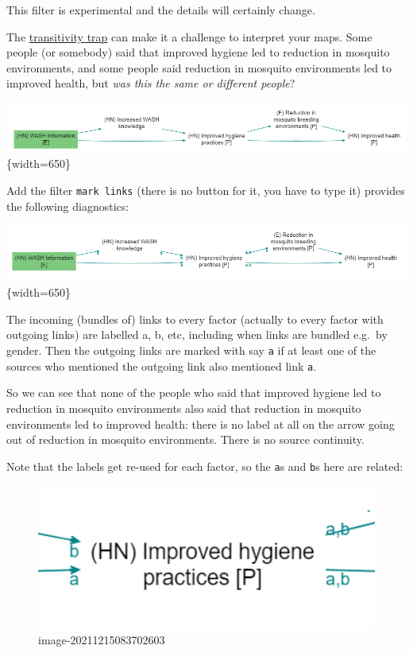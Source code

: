 \documentclass[
]{book}
\begin{document}
This filter is experimental and the details will certainly change.

The \protect\hyperlink{xtransitivity-trap}{transitivity trap} can make it a challenge to interpret your maps. Some people (or somebody) said that improved hygiene led to reduction in mosquito environments, and some people said reduction in mosquito environments led to improved health, but \emph{was this the same or different people}?

\includegraphics[width=6.77083in,height=\textheight]{_assets/image-20211215081735743.png}\{width=650\}

Add the filter \texttt{mark\ links} (there is no button for it, you have to type it) provides the following diagnostics:

\includegraphics[width=6.77083in,height=\textheight]{_assets/image-20211215081328481.png}\{width=650\}

The incoming (bundles of) links to every factor (actually to every factor with outgoing links) are labelled a, b, etc, including when links are bundled e.g.~by gender. Then the outgoing links are marked with say \texttt{a} if at least one of the sources who mentioned the outgoing link also mentioned link \texttt{a}.

So we can see that none of the people who said that improved hygiene led to reduction in mosquito environments also said that reduction in mosquito environments led to improved health: there is no label at all on the arrow going out of reduction in mosquito environments. There is no source continuity.

Note that the labels get re-used for each factor, so the \texttt{a}s and \texttt{b}s here are related:

\begin{figure}
\centering
\includegraphics[width=6.77083in,height=\textheight]{_assets/image-20211215083702603.png}
\caption{image-20211215083702603}
\end{figure}
\end{document}
